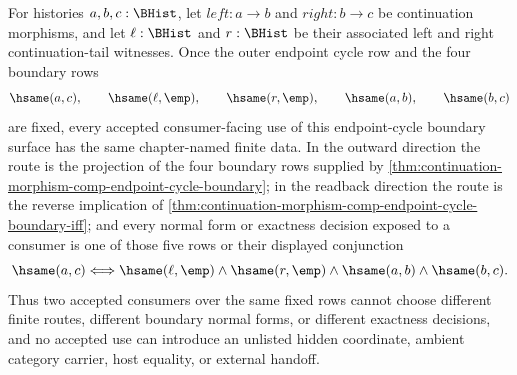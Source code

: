 \begin{corollary}
\label{cor:continuation-morphism-endpoint-cycle-boundary-consumer-determinacy}
For histories $a,b,c:\BHist$, let $left:a\to b$ and $right:b\to c$ be
continuation morphisms, and let $\ell:\BHist$ and $r:\BHist$ be their
associated left and right continuation-tail witnesses. Once the outer endpoint
cycle row and the four boundary rows
$$
\hsame(a,c),\qquad
\hsame(\ell,\emp),\qquad
\hsame(r,\emp),\qquad
\hsame(a,b),\qquad
\hsame(b,c)
$$
are fixed, every accepted consumer-facing use of this endpoint-cycle boundary
surface has the same chapter-named finite data. In the outward direction the
route is the projection of the four boundary rows supplied by
\autoref{thm:continuation-morphism-comp-endpoint-cycle-boundary}; in the
readback direction the route is the reverse implication of
\autoref{thm:continuation-morphism-comp-endpoint-cycle-boundary-iff}; and every
normal form or exactness decision exposed to a consumer is one of those five
rows or their displayed conjunction
$$
\hsame(a,c)\Longleftrightarrow
\hsame(\ell,\emp)\land
\hsame(r,\emp)\land
\hsame(a,b)\land
\hsame(b,c).
$$
Thus two accepted consumers over the same fixed rows cannot choose different
finite routes, different boundary normal forms, or different exactness
decisions, and no accepted use can introduce an unlisted hidden coordinate,
ambient category carrier, host equality, or external handoff.
\end{corollary}

